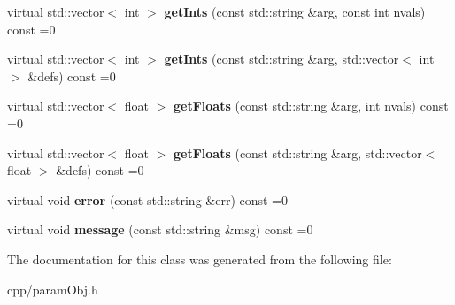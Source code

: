 \begin{DoxyCompactItemize}
virtual std\+::vector$<$ int $>$ {\bfseries get\+Ints} (const std\+::string \&arg, const int nvals) const =0
\item 
\mbox{\label{class_s_e_p_1_1param_obj_ac9d6ca7f9395a11b321cdbc7345f7c32}} 
virtual std\+::vector$<$ int $>$ {\bfseries get\+Ints} (const std\+::string \&arg, std\+::vector$<$ int $>$ \&defs) const =0
\item 
\mbox{\label{class_s_e_p_1_1param_obj_a21978675ff2e48e31abf3bbb4c9ac546}} 
virtual std\+::vector$<$ float $>$ {\bfseries get\+Floats} (const std\+::string \&arg, int nvals) const =0
\item 
\mbox{\label{class_s_e_p_1_1param_obj_a2d7012afdfaa6be2daaa2838d71ab703}} 
virtual std\+::vector$<$ float $>$ {\bfseries get\+Floats} (const std\+::string \&arg, std\+::vector$<$ float $>$ \&defs) const =0
\item 
\mbox{\label{class_s_e_p_1_1param_obj_a72d52abaf34632f2ee0daf11e295e970}} 
virtual void {\bfseries error} (const std\+::string \&err) const =0
\item 
\mbox{\label{class_s_e_p_1_1param_obj_a42a37ce4261b0fe4cb4cbd7a879660cb}} 
virtual void {\bfseries message} (const std\+::string \&msg) const =0
\end{DoxyCompactItemize}


The documentation for this class was generated from the following file\+:\begin{DoxyCompactItemize}
\item 
cpp/param\+Obj.\+h\end{DoxyCompactItemize}
